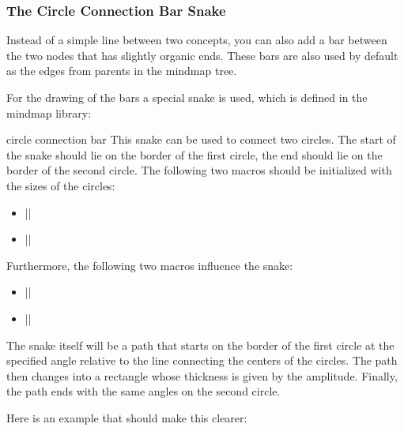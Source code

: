 \subsubsection{The Circle Connection Bar Snake}

Instead of a simple line between two concepts, you can also add a bar
between the two nodes that has slightly organic ends. These bars are
also used by default as the edges from parents in the mindmap tree.

For the drawing of the bars a special snake is used, which is defined
in the mindmap library:

\begin{snake}{circle connection bar}
  This snake can be used to connect two circles. The start of the
  snake should lie on the border of the first circle, the end should
  lie on the border of the second circle. The following two macros should be
  initialized with the sizes of the circles:
  \begin{itemize}
  \item |\pgfsnakecirclestartradius|
  \item |\pgfsnakecircleendradius|
  \end{itemize}
  Furthermore, the following two macros influence the snake:
  \begin{itemize}
  \item |\pgfsnakesegmentamplitude|
  \item |\pgfsnakesegmentangle|
  \end{itemize}
  The snake itself will be a path that starts on the border of the
  first circle at the specified angle relative to the line connecting
  the centers of the circles. The path then changes into a rectangle
  whose thickness is given by the amplitude. Finally, the path ends
  with the same angles on the second circle. 

  Here is an example that should make this clearer:
\begin{codeexample}[]
\end{codeexample}


\end{snake}
